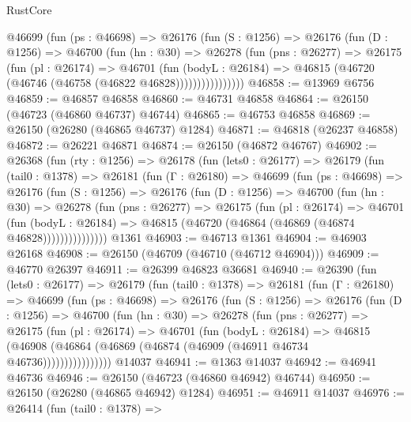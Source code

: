 \begin{lexlean}{RustCore}
\begin{coremodule}
            @46699
              (fun (ps : @46698) =>
              @26176
                (fun (S : @1256) =>
                @26176
                  (fun (D : @1256) =>
                  @46700
                    (fun (hn : @30) =>
                    @26278
                      (fun (pns : @26277) =>
                      @26175
                        (fun (pl : @26174) =>
                        @46701
                          (fun (bodyL : @26184) =>
                          @46815 (@46720 (@46746 (@46758 (@46822 @46828))))))))))))))))
@46858 := @13969 @6756
@46859 := @46857 @46858
@46860 := @46731 @46858
@46864 := @26150 (@46723 (@46860 @46737) @46744)
@46865 := @46753 @46858
@46869 := @26150 (@26280 (@46865 @46737) @1284)
@46871 := @46818 (@26237 @46858)
@46872 := @26221 @46871
@46874 := @26150 (@46872 @46767)
@46902 := @26368
    (fun (rty : @1256) =>
    @26178
      (fun (lets0 : @26177) =>
      @26179
        (fun (tail0 : @1378) =>
        @26181
          (fun (Γ : @26180) =>
          @46699
            (fun (ps : @46698) =>
            @26176
              (fun (S : @1256) =>
              @26176
                (fun (D : @1256) =>
                @46700
                  (fun (hn : @30) =>
                  @26278
                    (fun (pns : @26277) =>
                    @26175
                      (fun (pl : @26174) =>
                      @46701
                        (fun (bodyL : @26184) =>
                        @46815 (@46720 (@46864 (@46869 (@46874 @46828)))))))))))))))
    @1361
@46903 := @46713 @1361
@46904 := @46903 @26168
@46908 := @26150 (@46709 (@46710 (@46712 @46904)))
@46909 := @46770 @26397
@46911 := @26399 @46823 @36681
@46940 := @26390
    (fun (lets0 : @26177) =>
    @26179
      (fun (tail0 : @1378) =>
      @26181
        (fun (Γ : @26180) =>
        @46699
          (fun (ps : @46698) =>
          @26176
            (fun (S : @1256) =>
            @26176
              (fun (D : @1256) =>
              @46700
                (fun (hn : @30) =>
                @26278
                  (fun (pns : @26277) =>
                  @26175
                    (fun (pl : @26174) =>
                    @46701
                      (fun (bodyL : @26184) =>
                      @46815
                        (@46908
                          (@46864 (@46869 (@46874 (@46909 (@46911 @46734 @46736))))))))))))))))
    @14037
@46941 := @1363 @14037
@46942 := @46941 @46736
@46946 := @26150 (@46723 (@46860 @46942) @46744)
@46950 := @26150 (@26280 (@46865 @46942) @1284)
@46951 := @46911 @14037
@46976 := @26414
    (fun (tail0 : @1378) =>

\end{coremodule}
\end{lexlean}
